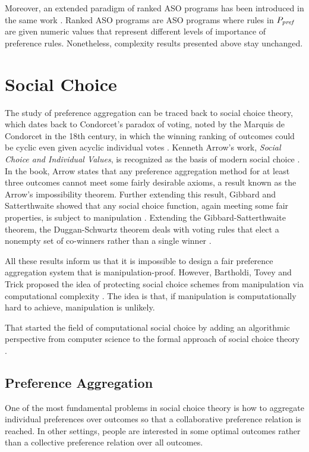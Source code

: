 Moreover, an extended paradigm of ranked ASO programs has
been introduced in the same work \cite{Brewka03answerset}.
Ranked ASO programs are ASO programs where rules in $P_{\mathit{pref}}$
are given numeric values that represent different levels of importance
of preference rules.  Nonetheless, complexity results presented
above stay unchanged.




\section{Social Choice}
The study of preference aggregation can be traced back to social choice theory,
which dates back to Condorcet's paradox of voting, noted by the
Marquis de Condorcet in the 18th century, in which
the winning ranking of outcomes could be cyclic even 
given acyclic individual votes \cite{wiki:soc}.
Kenneth Arrow's work, \textit{Social Choice and Individual Values},
is recognized as the basis of modern social choice \cite{aarrow:b:socialchoice}.
In the book, Arrow states that any preference aggregation method for at least three
outcomes cannot meet some fairly desirable axioms, a result known as
the Arrow's impossibility theorem.
Further extending this result, Gibbard and Satterthwaite showed
that any social choice function, again meeting some fair properties, is subject
to manipulation \cite{gib:j:maip-scheme,satt:j:strat-proof}.
Extending the Gibbard-Satterthwaite theorem, the Duggan-Schwartz theorem deals with 
voting rules that elect a nonempty set of co-winners rather than a single winner
\cite{dug-sch:j:maipres}.

All these results inform us that it is impossible to design a fair preference
aggregation system that is manipulation-proof.
However, Bartholdi, Tovey and Trick proposed the idea of protecting
social choice schemes from manipulation via computational
complexity \cite{bartholdi:j:whowon,bartholdi:j:compdiff,
bartholdi:j:howhard}.
The idea is that, if manipulation is computationally hard to
achieve, manipulation is unlikely.

That started the field of computational social choice by adding an algorithmic
perspective from computer science to the formal approach 
of social choice theory \cite{Brandt:COMSOC}.




\subsection{Preference Aggregation}
One of the most fundamental problems in social choice theory is how to
aggregate individual preferences over outcomes so that a
collaborative preference relation is reached.
In other settings, people are interested in some optimal outcomes
rather than a collective preference relation over all outcomes.

